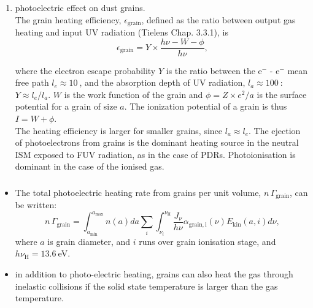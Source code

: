 \begin{frame}
\end{frame} \begin{frame}\frametitle{}

\begin{enumerate}
\conti
\item photoelectric effect on dust grains. \\
The grain heating efficiency, $\epsilon_\mathrm{grain}$, defined as the
ratio between output gas heating and input UV radiation (Tielens
Chap. 3.3.1), is 
\[ \epsilon_\mathrm{grain} =  Y \times \frac{h\nu - W - \phi }{h\nu}
,\]

where the electron escape probability $Y$ is the ratio between the
e$^-$ - e$^-$ mean free path $l_e \approx 10~$\angstrom, and the
absorption depth of UV radiation, $l_a \approx 100~$\angstrom :
$Y \approx l_e /l_a$.  $W$ is the work function of the grain and $\phi
= Z \times e^2 / a$ is the surface potential for a grain of size
$a$. The ionization potential of a grain is thus $ I = W + \phi$. \\
The heating efficiency is larger for smaller grains, since
$l_a \approx l_e$.  {\large The ejection of photoelectrons from grains
is the dominant heating source in the neutral ISM exposed to FUV
radiation, as in the case of PDRs. Photoionisation is dominant in the
case of the ionised gas.}
\seti
\end{enumerate}


\end{frame} \begin{frame}\frametitle{}

\begin{itemize}
\item The total photoelectric  heating  rate from grains per unit volume, $n\,\Gamma_\mathrm{grain}$, can be written:
\[ n\,\Gamma_\mathrm{grain} = \int_{a_\mathrm{min}}^{a_\mathrm{max}}
n(a) da \sum_i \int_{\nu_i}^{\nu_\mathrm{H}} \frac{J_\nu}{h\nu}
\alpha_\mathrm{grain,i}(\nu) E_\mathrm{kin}(a,i) d\nu   , \]
where $a$ is grain diameter, and $i$ runs over grain ionisation stage,
and $ h \nu_\mathrm{H} = 13.6~$eV.

\item in addition to photo-electric heating, grains can also heat the
gas through inelastic collisions if the solid state temperature is
larger than the gas temperature. 
\end{itemize}
 

\end{frame} \begin{frame}\frametitle{}



\end{frame}
